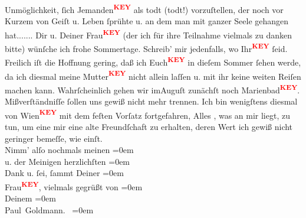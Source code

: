 \begin{ledgroupsized}[t]{13cm}
               Unmöglichkeit, ſich Jemanden\textcolor{red}{\textsuperscript{\textbf{KEY}}} als todt (todt!)
               vorzuſtellen, der noch vor Kurzem von Geiſt u. Leben ſprühte u. an dem man mit ganzer
               Seele gehangen hat....... \pend
           \pstart
           Dir u. Deiner Frau\textcolor{red}{\textsuperscript{\textbf{KEY}}} (der ich für ihre Teilnahme vielmals
               zu danken bitte) wünſche ich frohe Sommertage. Schreib’ mir jedenfalls, wo Ihr\textcolor{red}{\textsuperscript{\textbf{KEY}}} ſeid. Freilich iſt die Hoffnung gering, daß ich Euch\textcolor{red}{\textsuperscript{\textbf{KEY}}} in dieſem Sommer ſehen werde, da ich diesmal meine
                  Mutter\textcolor{red}{\textsuperscript{\textbf{KEY}}} nicht allein {\pb} laſſen u. mit ihr
               keine weiten Reiſen machen kann. Wahrſcheinlich gehen wir imAuguſt
               zunächſt noch Marienbad\textcolor{red}{\textsuperscript{\textbf{KEY}}}. \pend
           \pstart
           Mißverſtändniſſe ſollen uns gewiß nicht mehr trennen. Ich bin wenigſtens diesmal
               von Wien\textcolor{red}{\textsuperscript{\textbf{KEY}}} mit dem feſten Vorſatz fortgefahren, Alles , was an mir liegt, zu tun, um eine mir
                  \strikeout{\textcolor{gray}{mein}} eine alte Freundſchaft zu erhalten, deren Wert ich gewiß nicht geringer
               bemeſſe, wie einſt\strikeout{,}.{\\[\baselineskip]}Nimm’ alſo nochmals meinen\pend
           \leftskip=0em{}\pstart
           {\\[\baselineskip]}u. der Meinigen herzlichſten\pend
           \leftskip=0em{}\pstart
           {\\[\baselineskip]}Dank u. ſei, ſammt Deiner\pend
           \leftskip=0em{}\pstart
           {\\[\baselineskip]}Frau\textcolor{red}{\textsuperscript{\textbf{KEY}}}, vielmals gegrüßt von\pend
           \leftskip=0em{}\pstart
           {\\[\baselineskip]}Deinem\pend
           \leftskip=0em{}\pstart
           {\\[\baselineskip]}\spacefill\mbox{Paul Goldmann. }\pend
           \leftskip=0em{}
         
         \endnumbering{}\end{ledgroupsized}\begin{anhang}\end{anhang}\newcommand{\dateiname}{L03254}\newcommand{\titel}{Paul Goldmann an Arthur Schnitzler, 7. 7. 1907}\newcommand{\editorInnen}{Martin Anton Müller und Laura Untner}
      